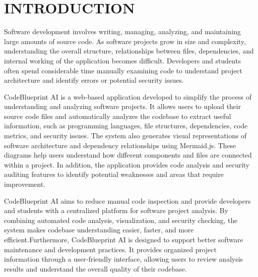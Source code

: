 \documentclass[0pt, a4 paper]{report}
\begin{document}
\begin{center}
{ 









\newpage  \begin{center}
 \tableofcontents
 \end{center}

\newpage \listoffigures

\newpage
\setcounter{page}{1}

\chapter{INTRODUCTION}

\justify Software development involves writing, managing, analyzing, and maintaining large amounts of source code. As software projects grow in size and complexity, understanding the overall structure, relationships between files, dependencies, and internal working of the application becomes difficult. Developers and students often spend considerable time manually examining code to understand project architecture and identify errors or potential security issues.

\justify CodeBlueprint AI is a web-based application developed to simplify the process of understanding and analyzing software projects. It allows users to upload their source code files and automatically analyzes the codebase to extract useful information, such as programming languages, file structures, dependencies, code metrics, and security issues.
\justify The system also generates visual representations of software architecture and dependency relationships using Mermaid.js. These diagrams help users understand how different components and files are connected within a project. In addition, the application provides code analysis and security auditing features to identify potential weaknesses and areas that require improvement.

\justify CodeBlueprint AI aims to reduce manual code inspection and provide developers and students with a centralized platform for software project analysis. By combining automated code analysis, visualization, and security checking, the system makes codebase understanding easier, faster, and more efficient.Furthermore, CodeBlueprint AI is designed to support better software maintenance and development practices. It provides organized project information through a user-friendly interface, allowing users to review analysis results and understand the overall quality of their codebase. 

}
\end{center}
\end{document}
